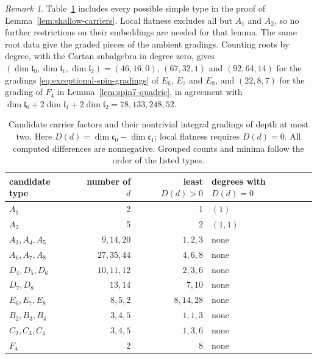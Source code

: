 \documentclass{article}
\theoremstyle{definition}
\theoremstyle{remark}
\newtheorem{remark}[theorem]{Remark}
\begin{document}
\begin{remark}
Table~\ref{tab:shallow-gradings} includes every possible simple
type in the proof of Lemma~\ref{lem:shallow-carriers}. Local flatness
excludes all but $A_1$ and $A_2$, so no further restrictions on their
embeddings are needed for that lemma.
The same root data give the graded pieces of
the ambient gradings. Counting roots by degree, with the Cartan subalgebra in
degree zero, gives
$(\dim\mathfrak l_0,\dim\mathfrak l_1,\dim\mathfrak l_2)=(46,16,0)$, $(67,32,1)$
and $(92,64,14)$ for the gradings \eqref{eq:exceptional-spin-gradings} of
$E_6$, $E_7$ and $E_8$, and $(22,8,7)$ for the grading of $F_4$ in
Lemma~\ref{lem:spin7-quadric}, in agreement with $\dim\mathfrak l_0+
2\dim\mathfrak l_1+2\dim\mathfrak l_2=78,133,248,52$.
\end{remark}

\begin{table}[ht]
\centering
\small
\renewcommand{\arraystretch}{1.12}
\begin{tabular}{lrrl}
\toprule
candidate type & number of $d$ & least $D(d)>0$ & degrees with $D(d)=0$\\\midrule
$A_1$ & 2 & 1 & $(1)$\\
$A_2$ & 5 & 2 & $(1,1)$\\
$A_3,A_4,A_5$ & $9,14,20$ & $1,2,3$ & none\\
$A_6,A_7,A_8$ & $27,35,44$ & $4,6,8$ & none\\
$D_4,D_5,D_6$ & $10,11,12$ & $2,3,6$ & none\\
$D_7,D_8$ & $13,14$ & $7,10$ & none\\
$E_6,E_7,E_8$ & $8,5,2$ & $8,14,28$ & none\\
$B_2,B_3,B_4$ & $3,4,5$ & $1,1,3$ & none\\
$C_2,C_3,C_4$ & $3,4,5$ & $1,3,6$ & none\\
$F_4$ & 2 & 8 & none\\\bottomrule
\end{tabular}
\caption{Candidate carrier factors and their nontrivial integral
gradings of depth at most two. Here $D(d)=\dim\mathfrak c_0-\dim\mathfrak c_1$;
local flatness requires $D(d)=0$. All computed differences are nonnegative.
Grouped counts and minima follow the order of the listed types.}
\label{tab:shallow-gradings}
\end{table}
\end{document}
